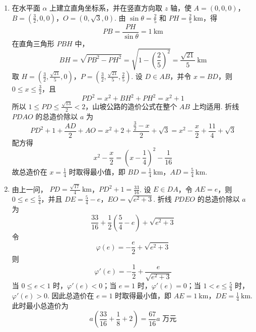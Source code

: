 \begin{solution}
\begin{enumerate}
\item
在水平面 \(\alpha\) 上建立直角坐标系，并在竖直方向取 \(z\) 轴，使 \(A=\left(0,0,0\right)\)，\(B=\left(\frac{3}{2},0,0\right)\)，\(O=\left(0,\sqrt{3},0\right)\).
由 \(\sin\theta=\frac{2}{5}\) 和 \(PH=\frac{2}{5}\mathrm{~km}\)，得
\[
PB=\frac{PH}{\sin\theta}=1\mathrm{~km}
\]
在直角三角形 \(PBH\) 中，
\[
BH=\sqrt{PB^2-PH^2}
   =\sqrt{1-\left(\frac{2}{5}\right)^2}
   =\frac{\sqrt{21}}{5}\mathrm{~km}
\]
取 \(H=\left(\frac{3}{2},\frac{\sqrt{21}}{5},0\right)\)，\(P=\left(\frac{3}{2},\frac{\sqrt{21}}{5},\frac{2}{5}\right)\).
设 \(D\in AB\)，并令 \(x=BD\)，则 \(0\leqslant x\leqslant\frac{3}{2}\)，且
\[
PD^2=x^2+BH^2+PH^2=x^2+1
\]
所以 \(1\leqslant PD\leqslant\frac{\sqrt{13}}{2}<2\)，山坡公路的造价公式在整个 \(AB\) 上均适用. 折线 \(PDAO\) 的总造价除以 \(a\) 为
\[
PD^2+1+\frac{AD}{2}+AO
=x^2+2+\frac{\frac{3}{2}-x}{2}+\sqrt{3}
=x^2-\frac{x}{2}+\frac{11}{4}+\sqrt{3}
\]
配方得
\[
x^2-\frac{x}{2}=\left(x-\frac{1}{4}\right)^2-\frac{1}{16}
\]
故总造价在 \(x=\frac{1}{4}\) 时取得最小值，即
\(BD=\frac{1}{4}\mathrm{~km}\)，\(AD=\frac{5}{4}\mathrm{~km}\).

\item
由上一问，
\(PD=\frac{\sqrt{17}}{4}\mathrm{~km}\)，\(PD^2+1=\frac{33}{16}\).
设 \(E\in DA\)，令 \(AE=e\)，则 \(0\leqslant e\leqslant\frac{5}{4}\)，并且
\(DE=\frac{5}{4}-e\)，\(EO=\sqrt{e^2+3}\).
折线 \(PDEO\) 的总造价除以 \(a\) 为
\[
\frac{33}{16}+\frac{1}{2}\left(\frac{5}{4}-e\right)+\sqrt{e^2+3}
\]
令
\[
\varphi(e)=-\frac{e}{2}+\sqrt{e^2+3}
\]
则
\[
\varphi'(e)=-\frac{1}{2}+\frac{e}{\sqrt{e^2+3}}
\]
当 \(0\leqslant e<1\) 时，\(\varphi'(e)<0\)；当 \(e=1\) 时，\(\varphi'(e)=0\)；当 \(1<e\leqslant\frac{5}{4}\) 时，\(\varphi'(e)>0\). 因此总造价在 \(e=1\) 时取得最小值，即
\(AE=1\mathrm{~km}\)，\(DE=\frac{1}{4}\mathrm{~km}\).
此时最小总造价为
\[
a\left(\frac{33}{16}+\frac{1}{8}+2\right)
=\frac{67}{16}a\text{ 万元}
\]


\end{enumerate}
\end{solution}
